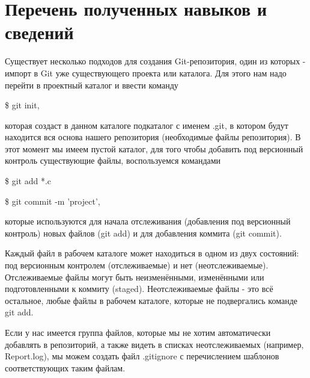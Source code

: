 \documentclass[a4paper,14pt]{report} %
\begin{document}
\section{Перечень полученных навыков и сведений}
Существует несколько подходов для создания Git-репозитория, один из которых - импорт в Git уже существующего проекта или каталога. Для этого нам надо перейти в проектный каталог и ввести команду 

\$ git init,

которая создаст в данном каталоге подкаталог с именем .git, в котором будут находится вся основа нашего репозитория (необходимые файлы репозитория).  В этот момент мы имеем пустой каталог, для того чтобы добавить под версионный контроль существующие файлы, воспользуемся командами

\$ git add *.c\par
\$ git commit -m 'project',

которые используются для начала отслеживания (добавления под версионный контроль) новых файлов (git add) и для добавления коммита (git commit). 

Каждый файл в рабочем каталоге может находиться в одном из двух состояний: под версионным контролем (отслеживаемые) и нет (неотслеживаемые). Отслеживаемые файлы могут быть неизменёнными, изменёнными или подготовленными к коммиту (staged). Неотслеживаемые файлы - это всё остальное, любые файлы в рабочем каталоге, которые не подвергались команде git add. 

Если у нас имеется группа файлов, которые мы не хотим автоматически добавлять в репозиторий, а также видеть в списках неотслеживаемых (например, Report.log), мы можем создать файл .gitignore с перечислением шаблонов соответствующих таким файлам.  
\end{document}
